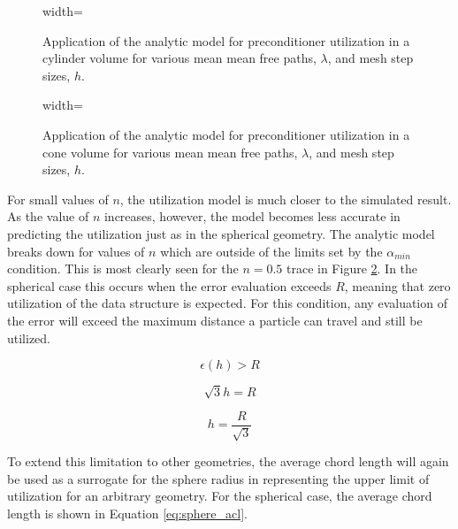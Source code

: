 \begin{figure}[H]
  \centering
  {width=\textwidth}
  \caption[Application of the utilization model for a cylinder
    geometry.]{Application of the analytic model for preconditioner utilization
    in a cylinder volume for various mean mean free paths, $\lambda$, and mesh
    step sizes, $h$.}
  \label{fig:sdf_util_sampled_cylinder}
\end{figure}


\begin{figure}[H]
  \centering
  {width=\textwidth}
  \caption[Application of the utilization model for a conic
    geometry.]{Application of the analytic model for preconditioner utilization
    in a cone volume for various mean mean free paths, $\lambda$, and mesh step
    sizes, $h$.}
  \label{fig:sdf_util_sampled_cone}
\end{figure}

For small values of $n$, the utilization model is much closer to the simulated
result. As the value of $n$ increases, however, the model becomes less accurate
in predicting the utilization just as in the spherical geometry. The analytic
model breaks down for values of $n$ which are outside of the limits set by the
$\alpha_{min}$ condition. This is most clearly seen for the $n = 0.5$ trace in
Figure \ref{fig:sdf_util_sampled_cone}. In the spherical case this occurs when
the error evaluation exceeds $R$, meaning that zero utilization of the data
structure is expected. For this condition, any evaluation of the error will
exceed the maximum distance a particle can travel and still be utilized.

\begin{equation}
  \epsilon(h) > R
\end{equation}

\begin{equation}
  \sqrt{3}h = R
\end{equation}

\begin{equation}
  h = \frac{R}{\sqrt{3}}
  \label{eq:error_condition_sphere}
\end{equation}

To extend this limitation to other geometries, the average chord length will
again be used as a surrogate for the sphere radius in representing the upper
limit of utilization for an arbitrary geometry. For the spherical case, the
average chord length is shown in Equation \eqref{eq:sphere_acl}.

